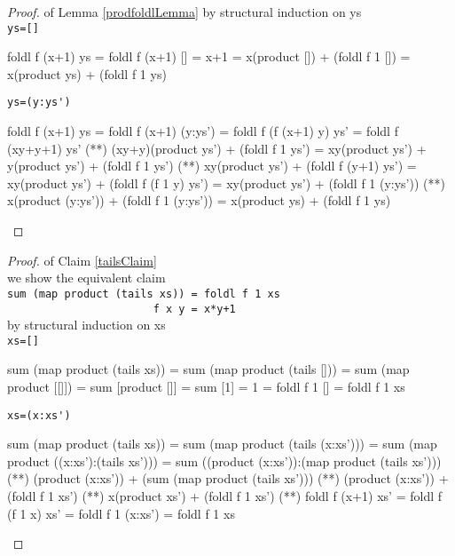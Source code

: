 \begin{proof} of Lemma \ref{prodfoldlLemma} by structural induction on ys\\
\verb|ys=[]|
\begin{code}
foldl f (x+1) ys
           = foldl f (x+1) []
           = x+1
           = x(product []) + (foldl f 1 [])
           = x(product ys) + (foldl f 1 ys)
\end{code}
\verb|ys=(y:ys')|
\begin{code}
foldl f (x+1) ys
           = foldl f (x+1) (y:ys')
           = foldl f (f (x+1) y) ys'
           = foldl f (xy+y+1) ys'
           (**) (xy+y)(product ys') + (foldl f 1 ys')
           = xy(product ys') + y(product ys') + (foldl f 1 ys')
           (**) xy(product ys') + (foldl f (y+1) ys')
           = xy(product ys') + (foldl f (f 1 y) ys')
           = xy(product ys') + (foldl f 1 (y:ys'))
           (*\sEq{\ref{prodLemma}}*) x(product (y:ys')) + (foldl f 1 (y:ys'))
           = x(product ys) + (foldl f 1 ys)
\end{code}
\end{proof}
\begin{proof} of Claim \ref{tailsClaim}\\
we show the equivalent claim\\
\verb|sum (map product (tails xs)) = foldl f 1 xs|\\
\verb|                       f x y = x*y+1|\\
by structural induction on xs\\
\verb|xs=[]|
\begin{code}
sum (map product (tails xs)) 
              = sum (map product (tails []))
              = sum (map product [[]])
              = sum [product []]
              = sum [1]
              = 1
              = foldl f 1 []
              = foldl f 1 xs
\end{code}
\verb|xs=(x:xs')|
\begin{code}
sum (map product (tails xs)) 
              = sum (map product (tails (x:xs')))
              = sum (map product ((x:xs'):(tails xs')))
              = sum ((product (x:xs')):(map product (tails xs')))
              (*\sEq{\ref{sumLemma}}*) (product (x:xs')) + (sum (map product (tails xs')))
              (**) (product (x:xs')) + (foldl f 1 xs')
              (*\sEq{\ref{prodLemma}}*) x(product xs') + (foldl f 1 xs')
              (*\sEq{\ref{prodfoldlLemma}}*) foldl f (x+1) xs'
              = foldl f (f 1 x) xs'
              = foldl f 1 (x:xs')
              = foldl f 1 xs
\end{code}
\end{proof}